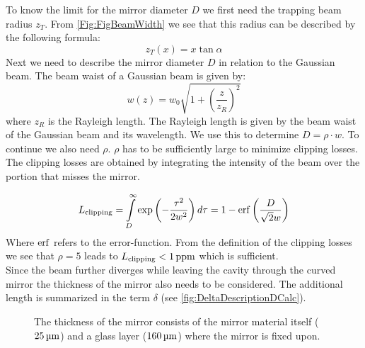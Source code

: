 To know the limit for the mirror diameter $D$ we first need the trapping beam radius $z_{\si{T}}$. From \autoref{Fig:FigBeamWidth} we see that this radius can be described by the following formula:
\begin{equation}\label{EqTrapRadius}
	z_{\si{T}}(x)=x\tan\alpha
\end{equation}
Next we need to describe the mirror diameter $D$ in relation to the Gaussian beam. The beam waist of a Gaussian beam is given by:
\begin{equation}
	w(z)=w_0\sqrt{1+\left(\frac{z}{z_{{\si{R}}}}\right)^2}
\end{equation}
where $z_{\si{R}}$ is the Rayleigh length. The Rayleigh length is given by the beam waist of the Gaussian beam and its wavelength. We use this to determine $D=\rho\cdot w$. To continue we also need $\rho$. $\rho$ has to be sufficiently large to minimize clipping losses. The clipping losses are obtained by integrating the intensity of the beam over the portion that misses the mirror.

\begin{equation}
	\de{L}{clipping}=\int\limits_D^\infty \exp\left(-\frac{\tau^2}{2w^2}\right)d\tau=1-\erf\left(\frac{D}{\sqrt{2}w}\right)
\end{equation}
Where $\erf$ refers to the error-function. From the definition of the clipping losses we see that $\rho=5$ leads to $\de{L}{clipping}<1\ppm$ which is sufficient.\\
Since the beam further diverges while leaving the cavity through the curved mirror the thickness of the mirror also needs to be considered. The additional length is summarized in the term $\delta$ (see \autoref{fig:DeltaDescriptionDCalc}).
\begin{figure}[H]
	
	\caption{The thickness of the mirror consists of the mirror material itself ($25\um$) and a glass layer ($160\um$) where the mirror is fixed upon.}
	\label{fig:DeltaDescriptionDCalc}
\end{figure}

